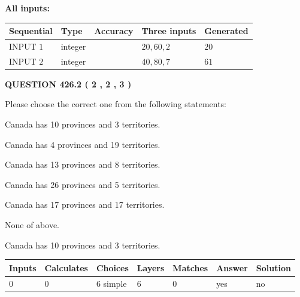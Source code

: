 \documentclass[12pt]{article}
\begin{document}
   
   
   
\noindent\vspace{0.1in}\hspace{-0.08in} {\textbf{\Large{All inputs: }}}
   
   
  
  
\noindent\begin{tabular}{|l|l|l|l|l|}
\hline
 Sequential & Type & Accuracy & Three inputs & Generated \\ 
\hline
 
 
  INPUT $  1 $ & integer &  & $
 20
 , 
 60
 , 
 2
 $ & $ 20 $ 
 \\  \hline  
 
 
  INPUT $  2 $ & integer &  & $
 40
 , 
 80
 , 
 7
 $ & $ 61 $ 
 \\  \hline  
 \end{tabular}
   
   
  
\vspace{0.2in}
  
{\textbf{\Large{QUESTION
426.2 
 ( 2 , 2 , 3 )
}}}
  
  
Please choose the correct one from the following statements:
 
 
Canada has 10  provinces and 3 territories.
 
 
Canada has   4 provinces and  19 territories.
 
 
Canada has  13 provinces and  8 territories.
 
 
Canada has  26 provinces and  5 territories.
 
 
Canada has  17 provinces and  17 territories.
 
 
 None of above.
 
 
\noindent{}
 
 
Canada has 10  provinces and 3 territories.
 
 
\noindent{}
 
 
   
   
   
   
\noindent\begin{tabular}{|l|l|l|l|l|l|l|}
 \hline
Inputs & Calculates & Choices & Layers & Matches & Answer & Solution \\ \hline
 0  & 
 0  & 
 6
  simple  
  & 
 6  & 
 0  & 
  yes & 
  no 
  \\ \hline
 \end{tabular}
   
\end{document}
